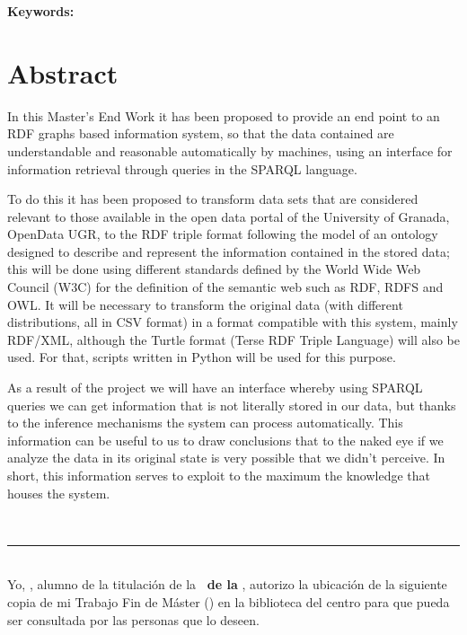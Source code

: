 \textbf{Keywords: }{\keywordsEn}

\section*{Abstract}

In this {\sf Master’s End Work} it has been proposed to provide an end point to an {\sf RDF graphs} based information system, so that the data contained are understandable and reasonable automatically by machines, using an interface for information retrieval through queries in the {\sf SPARQL} language.
\bigskip

To do this it has been proposed to transform data sets that are considered relevant to those available in the open data portal of the {\sf University of Granada}, {\sf OpenData UGR}, to the RDF triple format following the model of an ontology designed to describe and represent the information contained in the stored data; this will be done using different standards defined by the {\sf World Wide Web Council (W3C)} for the definition of the semantic web such as {\sf RDF}, {\sf RDFS} and {\sf OWL}. It will be necessary to transform the original data (with different distributions, all in {\sf CSV} format) in a format compatible with this system, mainly {\sf RDF/XML}, although the {\sf Turtle} format ({\sf Terse RDF Triple Language}) will also be used. For that, scripts written in {\sf Python} will be used for this purpose.

\bigskip
As a result of the project we will have an interface whereby using {\sf SPARQL} queries we can get information that is not literally stored in our data, but thanks to the inference mechanisms the system can process automatically. This information can be useful to us to draw conclusions that to the naked eye if we analyze the data in its original state is very possible that we didn't perceive. In short, this information serves to exploit to the maximum the knowledge that houses the system.

\newpage
\thispagestyle{empty}
\
\vspace{3cm}

\noindent\rule[-1ex]{\textwidth}{2pt}\\[4.5ex]

Yo, \textbf{\autor}, alumno de la titulación \textbf{\master} de la \textbf{\escuela\ de la \universidad}, autorizo la ubicación de la siguiente copia de mi Trabajo Fin de Máster (\textit{\titulo}) en la biblioteca del centro para que pueda ser consultada por las personas que lo deseen.

